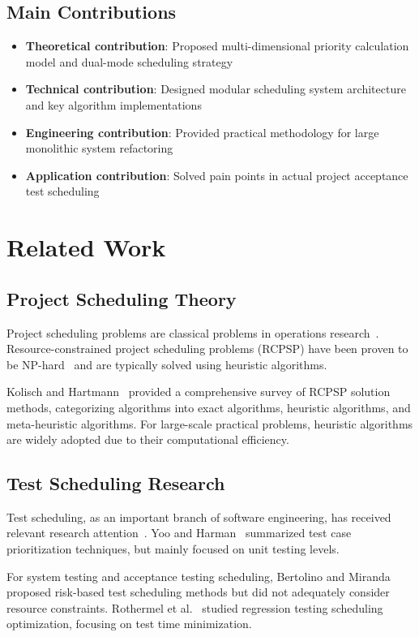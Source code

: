 \documentclass[journal]{IEEEtran}
\begin{document}
\subsection{Main Contributions}
\begin{itemize}
\item \textbf{Theoretical contribution}: Proposed multi-dimensional priority calculation model and dual-mode scheduling strategy
\item \textbf{Technical contribution}: Designed modular scheduling system architecture and key algorithm implementations
\item \textbf{Engineering contribution}: Provided practical methodology for large monolithic system refactoring
\item \textbf{Application contribution}: Solved pain points in actual project acceptance test scheduling
\end{itemize}

\section{Related Work}

\subsection{Project Scheduling Theory}
Project scheduling problems are classical problems in operations research~\cite{ref5}. Resource-constrained project scheduling problems (RCPSP) have been proven to be NP-hard~\cite{ref6} and are typically solved using heuristic algorithms.

Kolisch and Hartmann~\cite{ref7} provided a comprehensive survey of RCPSP solution methods, categorizing algorithms into exact algorithms, heuristic algorithms, and meta-heuristic algorithms. For large-scale practical problems, heuristic algorithms are widely adopted due to their computational efficiency.

\subsection{Test Scheduling Research}
Test scheduling, as an important branch of software engineering, has received relevant research attention~\cite{ref8,ref9}. Yoo and Harman~\cite{ref10} summarized test case prioritization techniques, but mainly focused on unit testing levels.

For system testing and acceptance testing scheduling, Bertolino and Miranda~\cite{ref11} proposed risk-based test scheduling methods but did not adequately consider resource constraints. Rothermel et al.~\cite{ref12} studied regression testing scheduling optimization, focusing on test time minimization.
\end{document}
